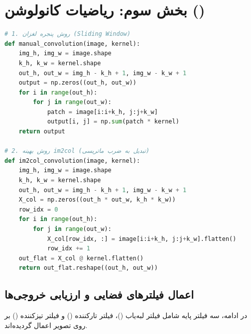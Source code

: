 \clearpage
\section{بخش سوم: ریاضیات کانولوشن ()}

\begin{stepbox}
\end{stepbox}

\begin{codebox}
\begin{lstlisting}[language=Python]
# 1. روش پنجره لغزان (Sliding Window)
def manual_convolution(image, kernel):
    img_h, img_w = image.shape
    k_h, k_w = kernel.shape
    out_h, out_w = img_h - k_h + 1, img_w - k_w + 1
    output = np.zeros((out_h, out_w))
    for i in range(out_h):
        for j in range(out_w):
            patch = image[i:i+k_h, j:j+k_w]
            output[i, j] = np.sum(patch * kernel)
    return output

# 2. روش بهینه im2col (تبدیل به ضرب ماتریسی)
def im2col_convolution(image, kernel):
    img_h, img_w = image.shape
    k_h, k_w = kernel.shape
    out_h, out_w = img_h - k_h + 1, img_w - k_w + 1
    X_col = np.zeros((out_h * out_w, k_h * k_w))
    row_idx = 0
    for i in range(out_h):
        for j in range(out_w):
            X_col[row_idx, :] = image[i:i+k_h, j:j+k_w].flatten()
            row_idx += 1
    out_flat = X_col @ kernel.flatten()
    return out_flat.reshape((out_h, out_w))
\end{lstlisting}
\end{codebox}

\subsection{اعمال فیلترهای فضایی و ارزیابی خروجی‌ها}

در ادامه، سه فیلتر پایه شامل فیلتر لبه‌یاب ()، فیلتر تارکننده () و فیلتر تیزکننده () بر روی تصویر اعمال گردیده‌اند.

